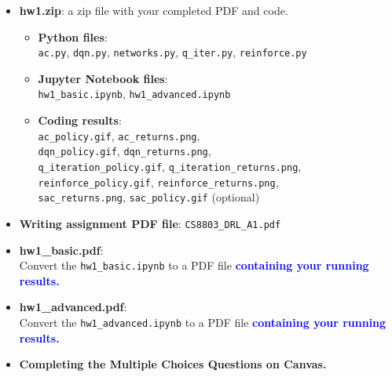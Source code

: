 \documentclass[letterpaper,12pt,addpoints]{exam}
\begin{document}
\begin{itemize}[left=0pt, label={\textcolor{blue}{$\square$}}]
    \item \textbf{hw1.zip}: a zip file with your completed PDF and code.
    \begin{itemize}[left=20pt, label={\textcolor{blue}{$\square$}}]
        \item \textbf{Python files}:\\ \texttt{ac.py}, \texttt{dqn.py}, \texttt{networks.py}, \texttt{q\_iter.py}, \texttt{reinforce.py}
        \item \textbf{Jupyter Notebook files}:\\ \texttt{hw1\_basic.ipynb}, \texttt{hw1\_advanced.ipynb}
        \item \textbf{Coding results}:\\ \texttt{ac\_policy.gif}, \texttt{ac\_returns.png},\\ \texttt{dqn\_policy.gif}, \texttt{dqn\_returns.png},\\ \texttt{q\_iteration\_policy.gif}, \texttt{q\_iteration\_returns.png},\\ \texttt{reinforce\_policy.gif}, \texttt{reinforce\_returns.png},\\ \texttt{sac\_returns.png}, \texttt{sac\_policy.gif} (optional)
    \end{itemize}
    \item \textbf{Writing assignment PDF file}: \texttt{CS8803\_DRL\_A1.pdf}
    \item \textbf{hw1\_basic.pdf}: \\ Convert the \texttt{hw1\_basic.ipynb} to a PDF file \textbf{\textcolor{blue}{containing your running results.}}
    \item \textbf{hw1\_advanced.pdf}:\\  Convert the \texttt{hw1\_advanced.ipynb} to a PDF file \textbf{\textcolor{blue}{containing your running results.}}
    \item \textbf{Completing the Multiple Choices Questions on Canvas.}
\end{itemize}
\end{document}
